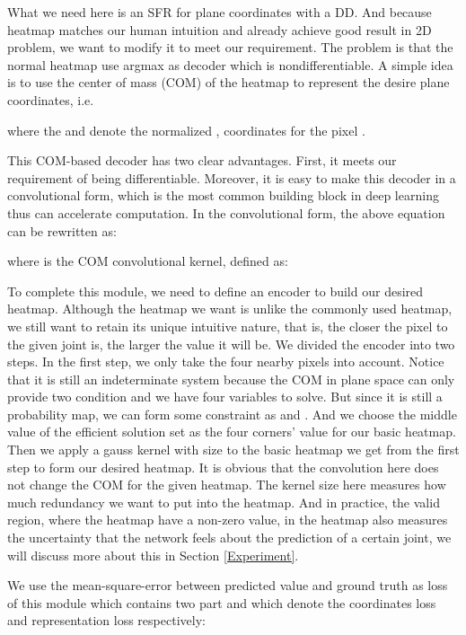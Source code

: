 \documentclass[journal]{IEEEtran}
\begin{document}
What we need here is an SFR for plane coordinates with a DD. 
And because heatmap matches our human intuition and already achieve good result in 2D problem, 
we want to modify it to meet our requirement. 
The problem is that the normal heatmap use argmax as decoder which is nondifferentiable. 
A simple idea is to use the center of mass (COM) of the heatmap to represent the desire plane coordinates, i.e. 





where the  and  denote the normalized ,  coordinates for the pixel  .

This COM-based decoder has two clear advantages. 
First, it meets our requirement of being differentiable. 
Moreover, it is easy to make this decoder in a convolutional form, which is the most common building block in deep learning thus can accelerate computation. 
In the convolutional form, the above equation can be rewritten as: 



where  is the COM convolutional kernel, defined as: 



To complete this module, we need to define an encoder to build our desired heatmap. 
Although the heatmap we want is unlike the commonly used heatmap, we still want to retain its unique intuitive nature, 
that is, the closer the pixel to the given joint is, the larger the value it will be. We divided the encoder into two steps. 
In the first step, we only take the four nearby pixels into account. 
Notice that it is still an indeterminate system because the COM in plane space can only provide two condition and we have four variables to solve. 
But since it is still a probability map, we can form some constraint as  and . 
And we choose the middle value of the efficient solution set as the four corners’ value for our basic heatmap. 
Then we apply a gauss kernel with size  to the basic heatmap we get from the first step to form our desired heatmap. 
It is obvious that the convolution here does not change the COM for the given heatmap. 
The kernel size here measures how much redundancy we want to put into the heatmap. 
And in practice, the valid region, where the heatmap have a non-zero value, 
in the heatmap also measures the uncertainty that the network feels about the prediction of a certain joint, 
we will discuss more about this in Section \ref{Experiment}.

We use the mean-square-error between predicted value and ground truth as loss of this module 
which contains two part  and  which denote the coordinates loss and representation loss respectively:
\end{document}
